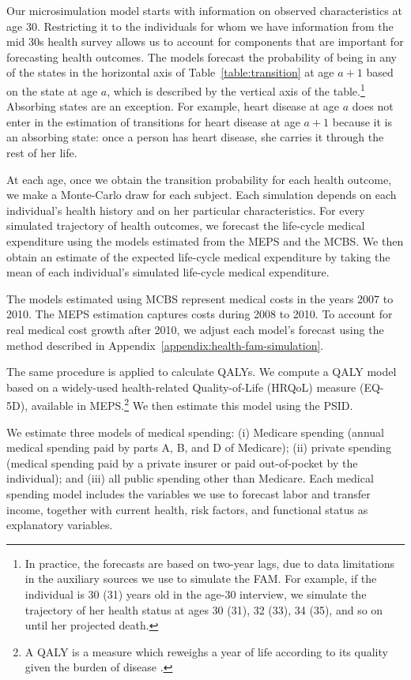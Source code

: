 Our microsimulation model starts with information on observed characteristics at age 30. Restricting it to the individuals for whom we have information from the mid 30s health survey allows us to account for components that are important for forecasting health outcomes. The models forecast the probability of being in any of the states in the horizontal axis of Table~\ref{table:transition} at age $a+1$ based on the state at age $a$, which is described by the vertical axis of the table.\footnote{In practice, the forecasts are based on two-year lags, due to data limitations in the auxiliary sources we use to simulate the FAM. For example, if the individual is 30 (31) years old in the age-30 interview, we simulate the trajectory of her health status at ages 30 (31), 32 (33), 34 (35), and so on until her projected death.} Absorbing states are an exception. For example, heart disease at age $a$ does not enter in the estimation of transitions for heart disease at age $a+1$ because it is an absorbing state: once a person has heart disease, she carries it through the rest of her life.

At each age, once we obtain the transition probability for each health outcome, we make a Monte-Carlo draw for each subject. Each simulation depends on each individual's health history and on her particular characteristics. For every simulated trajectory of health outcomes, we forecast the life-cycle medical expenditure using the models estimated from the MEPS and the MCBS. We then obtain an estimate of the expected life-cycle medical expenditure by taking the mean of each individual's simulated life-cycle medical expenditure.

The models estimated using MCBS represent medical costs in the years 2007 to 2010. The MEPS estimation captures costs during 2008 to 2010. To account for real medical cost growth after 2010, we adjust each model's forecast using the method described in  Appendix~\ref{appendix:health-fam-simulation}.

The same procedure is applied to calculate QALYs. We compute a QALY model based on a widely-used health-related Quality-of-Life (HRQoL) measure (EQ-5D), available in MEPS.\footnote{A QALY is a measure which reweighs a year of life according to its quality given the burden of disease \citep{Dolan_1997_Modeling_MC,Shaw_etal_2005_EQ5D_MC}.} We then estimate this model using the PSID.

We estimate three models of medical spending: (i) Medicare spending (annual medical spending paid by parts A, B, and D of Medicare); (ii) private spending (medical spending paid by a private insurer or paid out-of-pocket by the individual); and (iii) all public spending other than Medicare. Each medical spending model includes the variables we use to forecast labor and transfer income, together with current health, risk factors, and functional status as explanatory variables.

